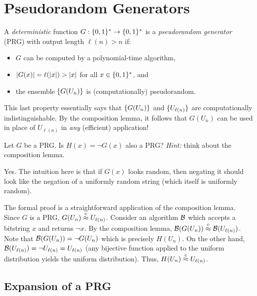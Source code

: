 \documentclass[11pt]{article}
\begin{document}
\section{Pseudorandom Generators}
\label{sec:prgs}

\begin{definition}
  \label{def:prg}
  A \emph{deterministic} function $G : \{0,1\}^{*} \to \{0,1\}^{*}$ is a
  \emph{pseudorandom generator} (PRG) with output length $\ell(n) > n$
  if:
  \begin{itemize}
  \item $G$ can be computed by a polynomial-time algorithm,
  \item $\lvert G(x)\rvert = \ell(\lvert x\rvert) > \lvert x\rvert$ for all $x \in
    \{0,1\}^{*}$, and
  \item the ensemble $\{G(U_{n})\}$ is (computationally)
    pseudorandom.
  \end{itemize}
  
  This last property essentially says that $\{G(U_{n})\}$ and
  $\{U_{\ell(n)}\}$ are computationally indistinguishable. By the
  composition lemma, it follows that $G(U_{n})$ can be used in place
  of $U_{\ell(n)}$ in \emph{any} (efficient) application!
\end{definition}


\begin{question}
    Let \(G\) be a PRG. Is \(H(x) = \lnot G(x)\) also a PRG? \emph{Hint:} think about
    the composition lemma.
\end{question}
\begin{answer}
    Yes. The intuition here is that if \(G(x)\) looks random, then negating it
    should look like the negation of a uniformly random string (which itself is
    uniformly random).


    \noindent The formal proof is a straightforward application of the composition lemma. Since
    \(G\) is a PRG, \(G(U_n) \stackrel{c}{\approx} U_{\ell(n)}\). Consider an algorithm \(\mathcal{B}\)
    which accepts a bitstring \(x\) and returns \(\lnot x\). By the composition lemma,
    \(\mathcal{B}(G(U_n)) \stackrel{c}{\approx} \mathcal{B}(U_{\ell(n)})\). Note that \(\mathcal{B}(G(U_n)) = \lnot
    G(U_n)\) which is precisely \(H(U_n)\). On the other hand, \(\mathcal{B}(U_{\ell(n)}) =
    \lnot U_{\ell(n)} = U_{\ell(n)}\) (any bijective function applied to the uniform
    distribution yields the uniform distribution). Thus, \(H(U_n) \stackrel{c}{\approx} U_{\ell(n)}\).
\end{answer}

\subsection{Expansion of a PRG}
\label{sec:properties}
\end{document}
